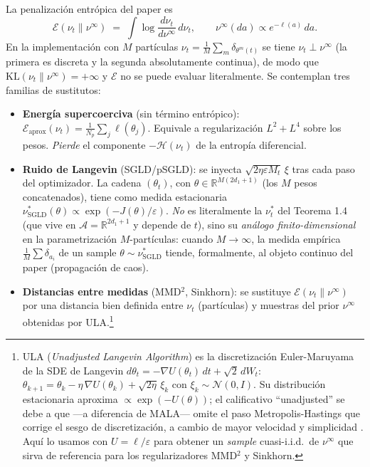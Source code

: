 \documentclass[11pt, a4paper]{article}
\theoremstyle{definition}
\newcommand{\eps}{\varepsilon}
\begin{document}
La penalización entrópica del paper es
\[
  \mathcal E(\nu_t\|\nu^\infty) \;=\; \int \log\frac{d\nu_t}{d\nu^\infty}\,d\nu_t,
  \qquad \nu^\infty(da)\propto e^{-\ell(a)}\,da.
\]
En la implementación con $M$ partículas $\nu_t = \tfrac1M\sum_m\delta_{\theta^m(t)}$
se tiene $\nu_t \perp \nu^\infty$ (la primera es discreta y la
segunda absolutamente continua), de modo que
$\mathrm{KL}(\nu_t\|\nu^\infty)=+\infty$ y $\mathcal E$ no se puede
evaluar literalmente. Se contemplan tres familias de sustitutos:
\begin{itemize}
  \item \textbf{Energía supercoerciva} (sin término entrópico):
        $\mathcal E_{\text{aprox}}(\nu_t)=
        \tfrac1{N_p}\sum_j \ell(\theta_j)$.
        Equivale a regularización $L^2+L^4$ sobre los pesos.
        \emph{Pierde} el componente $-\mathcal H(\nu_t)$ de la
        entropía diferencial.
  \item \textbf{Ruido de Langevin} (SGLD/pSGLD): se inyecta
        $\sqrt{2\eta\eps M_t}\,\xi$ tras cada paso del optimizador.
        La cadena $(\theta_t)$, con $\theta\in\mathbb{R}^{M(2d_1+1)}$
        (los $M$ pesos concatenados), tiene como medida estacionaria
        $\nu^*_{\mathrm{SGLD}}(\theta)\propto \exp(-J(\theta)/\eps)$.
        \emph{No} es literalmente la $\nu^*_t$ del Teorema 1.4 (que
        vive en $\mathcal A=\mathbb{R}^{2d_1+1}$ y depende de $t$),
        sino su \emph{análogo finito-dimensional} en la
        parametrización $M$-partículas: cuando $M\to\infty$, la
        medida empírica $\tfrac1M\sum\delta_{a_i}$ de un sample
        $\theta\sim\nu^*_{\mathrm{SGLD}}$ tiende, formalmente, al
        objeto continuo del paper (propagación de caos).
  \item \textbf{Distancias entre medidas} (MMD$^2$, Sinkhorn): se
        sustituye $\mathcal E(\nu_t\|\nu^\infty)$ por una distancia
        bien definida entre $\nu_t$ (partículas) y muestras del
        prior $\nu^\infty$ obtenidas por ULA.\footnote{ULA
        (\emph{Unadjusted Langevin Algorithm}) es la discretización
        Euler-Maruyama de la SDE de Langevin
        $d\theta_t = -\nabla U(\theta_t)\,dt + \sqrt{2}\,dW_t$:
        $\theta_{k+1} = \theta_k - \eta\,\nabla U(\theta_k)
        + \sqrt{2\eta}\,\xi_k$ con $\xi_k\sim\mathcal N(0,I)$.
        Su distribución estacionaria aproxima
        $\propto\exp(-U(\theta))$; el calificativo ``unadjusted''
        se debe a que ---a diferencia de MALA--- omite el paso
        Metropolis-Hastings que corrige el sesgo de discretización,
        a cambio de mayor velocidad y simplicidad
        \cite{RobertsTweedie1996,Durmus2017}. Aquí lo usamos con
        $U=\ell/\eps$ para obtener un \emph{sample} cuasi-i.i.d.\ de
        $\nu^\infty$ que sirva de referencia para los regularizadores
        MMD$^2$ y Sinkhorn.}
\end{itemize}
\end{document}

